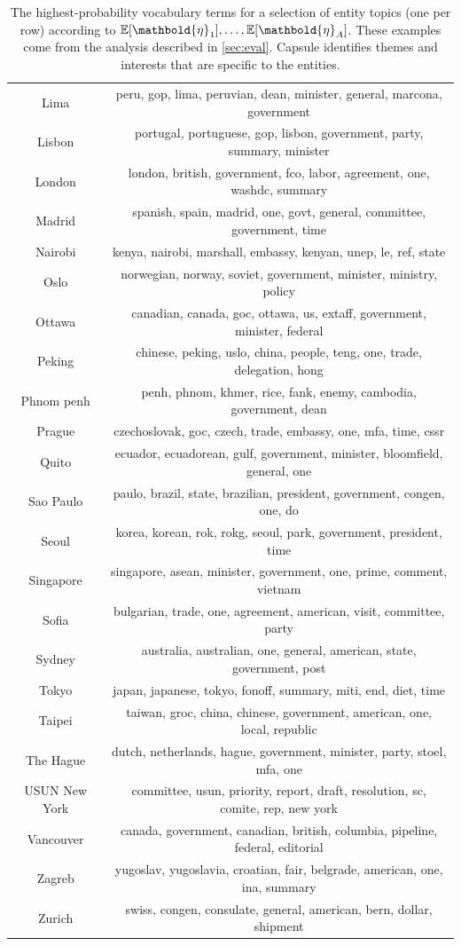\begin{table}
\begin{tabular}{cc}
Lima & peru, gop, lima, peruvian, dean, minister, general, marcona, government \\
Lisbon & portugal, portuguese, gop, lisbon, government, party, summary, minister \\
London & london, british, government, fco, labor, agreement, one, washdc, summary \\
Madrid & spanish, spain, madrid, one, govt, general, committee, government, time \\
Nairobi & kenya, nairobi, marshall, embassy, kenyan, unep, le, ref, state \\
Oslo & norwegian, norway, soviet, government, minister, ministry, policy \\
Ottawa & canadian, canada, goc, ottawa, us, extaff, government, minister, federal \\
Peking & chinese, peking, uslo, china, people, teng, one, trade, delegation, hong \\
Phnom penh & penh, phnom, khmer, rice, fank, enemy, cambodia, government, dean \\
Prague & czechoslovak, goc, czech, trade, embassy, one, mfa, time, cssr \\
Quito & ecuador, ecuadorean, gulf, government, minister, bloomfield, general, one \\
Sao Paulo & paulo, brazil, state, brazilian, president, government, congen, one, do \\
Seoul & korea, korean, rok, rokg, seoul, park, government, president, time \\
Singapore & singapore, asean, minister, government, one, prime, comment, vietnam \\
Sofia & bulgarian, trade, one, agreement, american, visit, committee, party \\
Sydney & australia, australian, one, general, american, state, government, post \\
Tokyo & japan, japanese, tokyo, fonoff, summary, miti, end, diet, time \\
Taipei & taiwan, groc, china, chinese, government, american, one, local, republic \\
The Hague & dutch, netherlands, hague, government, minister, party, stoel, mfa, one \\
USUN New York & committee, usun, priority, report, draft, resolution, sc, comite, rep, new york \\
Vancouver & canada, government, canadian, british, columbia, pipeline, federal, editorial \\
Zagreb & yugoslav, yugoslavia, croatian, fair, belgrade, american, one, ina, summary \\
Zurich & swiss, congen, consulate, general, american, bern, dollar, shipment \\
\bottomrule
\end{tabular}
\caption{The highest-probability vocabulary terms
for a selection of
entity topics (one per row) according to
$\E[\mathbold{\eta}_1], \ldots, \E[\mathbold{\eta}_A]$. These
examples come from the analysis described in \cref{sec:eval}. Capsule
identifies themes and interests that are specific to the entities.}
\label{tab:entities}
\end{table}

